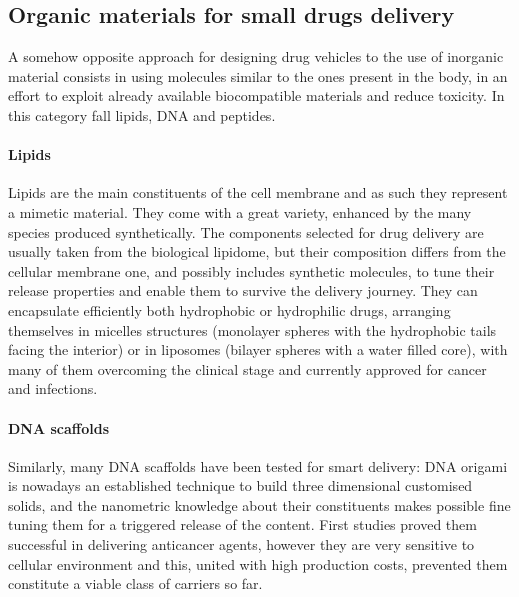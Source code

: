 \documentclass[a4paper,11pt]{extreport}
\begin{document}
\subsection{Organic materials for small drugs delivery}

A somehow opposite approach for designing drug vehicles to the use of inorganic material consists in using molecules similar to the ones present in the body, in an effort to exploit already available biocompatible materials and reduce toxicity.\cite{Yoo2011} In this category fall lipids, DNA and peptides.

\paragraph{Lipids} Lipids are the main constituents of the cell membrane and as such they represent a mimetic material. They come with a great variety, enhanced by the many species produced synthetically. The components selected for drug delivery are usually taken from the biological lipidome, but their composition differs from the cellular membrane one, and possibly includes synthetic molecules, to tune their release properties and enable them to survive the delivery journey.\cite{Yingchoncharoen2016} They can encapsulate efficiently both hydrophobic or hydrophilic drugs, arranging themselves in micelles structures (monolayer spheres with the hydrophobic tails facing the interior) or in liposomes (bilayer spheres with a water filled core),\cite{Bunker2016} with many of them overcoming the clinical stage and currently approved for cancer and infections.\cite{Pattni2015paper, Jain2017}

\paragraph{DNA scaffolds} Similarly, many DNA scaffolds have been tested for smart delivery: DNA origami is nowadays an established technique to build three dimensional customised solids\cite{Linko2015}, and the nanometric knowledge about their constituents makes possible fine tuning them for a triggered release of the content.\cite{Douglas2012} First studies proved them successful in delivering anticancer agents,\cite{Zhang2014, Jiang2012} however they are very sensitive to cellular environment and this, united with high production costs, prevented them constitute a viable class of carriers so far.
\end{document}

